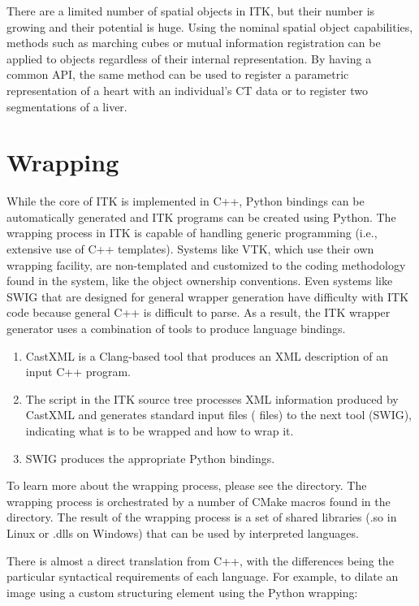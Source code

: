 There are a limited number of spatial objects in ITK, but
their number is growing and their potential is huge. Using the nominal
spatial object capabilities, methods such as marching cubes or mutual
information registration can be applied to objects regardless of their
internal representation. By having a common API, the same method can be used
to register a parametric representation of a heart with an individual's CT
data or to register two segmentations of a liver.


\section{Wrapping}
\label{sec:Wrapping}


While the core of ITK is implemented in C++, Python bindings can be
automatically generated and ITK programs can be created using Python.  The
wrapping process in ITK is capable of handling generic programming (i.e.,
extensive use of C++ templates). Systems like VTK, which use their own
wrapping facility, are non-templated and customized to the coding methodology
found in the system, like the object ownership conventions. Even systems
like SWIG that are designed for general wrapper generation have difficulty
with ITK code because general C++ is difficult to parse. As a result, the ITK
wrapper generator uses a combination of tools to produce language bindings.

\begin{enumerate}
  \item CastXML is a Clang-based tool that
    produces an XML description of an input C++ program.
  \item The  script in the ITK source tree processes XML
    information produced by CastXML and generates standard input files
    ( files) to the next tool (SWIG), indicating what is to be wrapped
    and how to wrap it.
  \item SWIG produces the appropriate Python bindings.
\end{enumerate}

To learn more about the wrapping process, please see the 
directory. The wrapping process is orchestrated by a number of CMake macros
found in the  directory. The result of the wrapping process is
a set of shared libraries (.so in Linux or .dlls on Windows) that can be used
by interpreted languages.

There is almost a direct translation from C++, with the differences being the
particular syntactical requirements of each language. For example, to dilate an
image using a custom structuring element using the Python wrapping:

